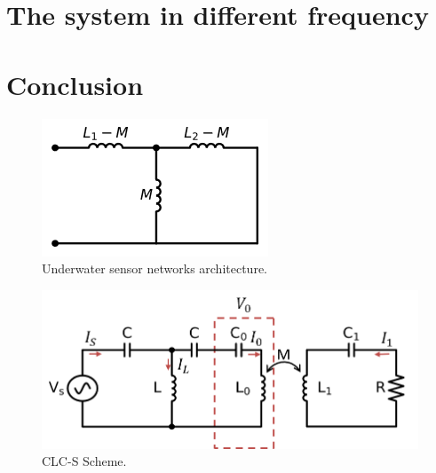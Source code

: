 \section{The system in different frequency}


\section{Conclusion}


\begin{figure}[htbp]
    \centering
    \includegraphics[width=0.4\linewidth]{images/3_mutual_inductance.png}
    \caption{Underwater sensor networks architecture.}
    \label{fig:3_mutual_inductance}
\end{figure}



\begin{figure}[htbp]
    \centering
    \includegraphics[width=0.8\linewidth]{images/3_clc_s_scheme.png}
    \caption{CLC-S Scheme.}
    \label{fig:3_clc_s_scheme}
\end{figure}
